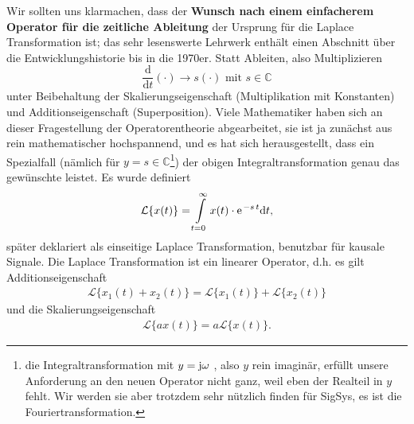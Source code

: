 \documentclass[11pt,a4paper,DIV=12]{scrartcl}
\numberwithin{equation}{section}
\numberwithin{figure}{section}
\newcommand\fsd{\mathrm{d}} %
\begin{document}
Wir sollten uns klarmachen, dass der \textbf{Wunsch nach einem einfacherem Operator
für die zeitliche Ableitung} der Ursprung für die Laplace Transformation ist;
das sehr lesenswerte Lehrwerk \cite{LangeSigSys1} enthält einen Abschnitt über die
Entwicklungshistorie bis in die 1970er.
Statt Ableiten, also Multiplizieren
\begin{equation}
  \frac{\fsd }{\fsd t} (\cdot) \rightarrow s(\cdot ) \text{ mit } s \in \mathbb{C}
\end{equation}
unter Beibehaltung der Skalierungseigenschaft (Multiplikation mit Konstanten)
und Additionseigenschaft (Superposition).
%
Viele Mathematiker haben sich an dieser Fragestellung der Operatorentheorie
abgearbeitet, sie ist ja zunächst aus rein mathematischer hochspannend, und
es hat sich herausgestellt, dass ein Spezialfall
(nämlich für $y=s\in\mathbb{C}$\footnote{die Integraltransformation mit $y=\im\omega$
, also $y$ rein imaginär, erfüllt unsere Anforderung an den neuen Operator nicht ganz,
weil eben der Realteil in $y$ fehlt. Wir werden sie aber trotzdem sehr nützlich finden
für SigSys, es ist die Fouriertransformation.})
der obigen
Integraltransformation genau das gewünschte leistet. Es wurde definiert
\begin{align}
\mathcal{L}\{x(t)\} = \int\limits_{t=0}^{\infty} x(t) \cdot \e^{-s\,t} \fsd t,
\end{align}
später deklariert als einseitige Laplace Transformation, benutzbar
für kausale Signale.
%
Die Laplace Transformation ist ein linearer Operator, d.h.
es gilt Additionseigenschaft
\begin{align}
\mathcal{L}\{x_1(t)+x_2(t)\} = \mathcal{L}\{x_1(t)\} + \mathcal{L}\{x_2(t)\}
\end{align}
und die Skalierungseigenschaft
\begin{align}
\mathcal{L}\{a x(t)\} = a \mathcal{L}\{x(t)\}.
\end{align}
\end{document}
